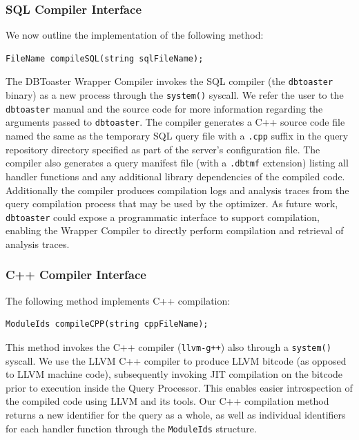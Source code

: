 \documentclass[14pt]{article}
\newcommand{\preliminary}[1]{\textcolor{prelim}{#1}}
\newcommand{\comment}[1]{}
\begin{document}
\subsubsection{SQL Compiler Interface}

We now outline the implementation of the following method:

\begin{Verbatim}
FileName compileSQL(string sqlFileName);
\end{Verbatim}

The DBToaster Wrapper Compiler invokes the SQL compiler (the \texttt{dbtoaster}
binary) as a new process through the \texttt{system()} syscall.  We refer the
user to the \texttt{dbtoaster} manual and the source code for more information
regarding the arguments passed to \texttt{dbtoaster}. The compiler generates a
C++ source code file named the same as the temporary SQL query file with a
\texttt{.cpp} suffix in the query repository directory specified as part of the
server's configuration file. The compiler also generates a query manifest file
(with a \texttt{.dbtmf} extension) listing all handler functions and any
additional library dependencies of the compiled code.
\preliminary{Additionally the compiler produces compilation logs and analysis
  traces from the query compilation process that may be used by the optimizer.}
\preliminary{As future work, \texttt{dbtoaster} could expose a programmatic
interface to support compilation, enabling the Wrapper Compiler to directly
perform compilation and retrieval of analysis traces.}

\comment{
The SQL compiler takes SQL query from a file and creates an optimized, DBToaster,
C++ coded to be added to the runtime. File containing code is returned to the
Admin.
}

\subsubsection{C++ Compiler Interface}

The following method implements C++ compilation:

\begin{Verbatim}
ModuleIds compileCPP(string cppFileName);
\end{Verbatim}

This method invokes the C++ compiler (\texttt{llvm-g++}) also through a
\texttt{system()} syscall. We use the LLVM C++ compiler to produce LLVM bitcode
(as opposed to LLVM machine code), subsequently invoking JIT compilation on the
bitcode prior to execution inside the Query Processor. This enables easier
introspection of the compiled code using LLVM and its tools.  Our C++
compilation method returns a new identifier for the query as a whole, as well as
individual identifiers for each handler function through the \texttt{ModuleIds}
structure.
\end{document}

